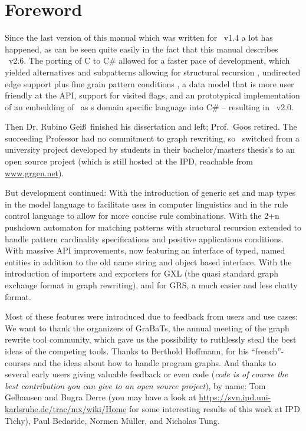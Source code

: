 \chapter*{Foreword}

Since the last version of this manual which was written for \GrG\ v1.4 a lot has happened, 
as can be seen quite easily in the fact that this manual describes \GrG\ v2.6.
The porting of C to C\# \cite{Kro:07} allowed for a faster pace of development,
which yielded alternatives and subpatterns allowing for structural recursion \cite{Jak:08,StructuralRecursion},
undirected edge support plus fine grain pattern conditions \cite{SABuchwald:2008}, 
a data model that is more user friendly at the API, support for visited flags, 
and an prototypical implementation of an embedding of \GrG\ as s domain specific language into C\# \cite{DAMoritz}
-- resulting in \GrG\ v2.0.
\medskip

Then Dr. Rubino Gei\ss~finished his dissertation \cite{DissRuby} and left; Prof.\ Goos retired.
The succeeding Professor had no commitment to graph rewriting,
so \GrG\ switched from a university project developed by students in their bachelor/masters thesis's
to an open source project (which is still hosted at the IPD, reachable from \url{www.grgen.net}).
\medskip

But development continued:
With the introduction of generic set and map types in the model language to facilitate uses in computer linguistics
and in the rule control language to allow for more concise rule combinations.
With the 2+n pushdown automaton for matching patterns with structural recursion extended 
to handle pattern cardinality specifications and positive applications conditions.
With massive API improvements, now featuring an interface of typed, named entities in addition to the old name string and object based interface.
With the introduction of importers and exporters for GXL (the quasi standard graph exchange format in graph rewriting),
and for GRS, a much easier and less chatty format.\smallskip

Most of these features were introduced due to feedback from users and use cases:\\
We want to thank the organizers of GraBaTs\cite{grabats}, the annual meeting of the graph rewrite tool community,
which gave us the possibility to ruthlessly steal the best ideas of the competing tools.
Thanks to Berthold Hoffmann, for his ``french''-courses and the ideas about how to handle program graphs.
And thanks to several early users giving valuable feedback or even code (\emph{code is of course the best contribution you can give to an open source project}), by name: 
Tom Gelhausen and Bugra Derre (you may have a look at \url{https://svn.ipd.uni-karlsruhe.de/trac/mx/wiki/Home} for some interesting results of this work at IPD Tichy), Paul Bedaride, Normen Müller, and Nicholas Tung.
\\[1ex]

